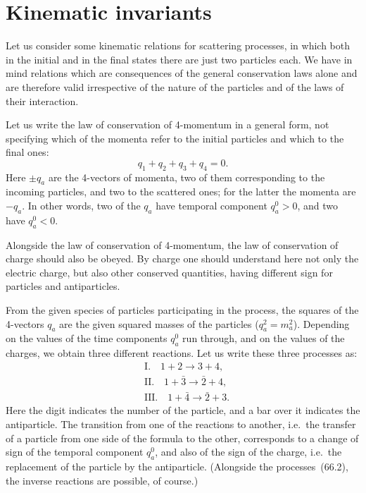 \section{Kinematic invariants}

Let us consider some kinematic relations for scattering processes, in which both in the initial and in the final states there are just two particles each. We have in mind relations which are consequences of the general conservation laws alone and are therefore valid irrespective of the nature of the particles and of the laws of their interaction.

Let us write the law of conservation of 4-momentum in a general form, not specifying which of the momenta refer to the initial particles and which to the final ones:
\begin{equation}
q_1 + q_2 + q_3 + q_4 = 0.
\tag{66.1}
\end{equation}
Here $\pm q_a$ are the 4-vectors of momenta, two of them corresponding to the incoming particles, and two to the scattered ones; for the latter the momenta are $-q_a$.  In other words, two of the $q_a$ have temporal component $q^0_a > 0$, and two have $q^0_a < 0$.

Alongside the law of conservation of 4-momentum, the law of conservation of charge should also be obeyed. By charge one should understand here not only the electric charge, but also other conserved quantities, having different sign for particles and antiparticles.

From the given species of particles participating in the process, the squares of the 4-vectors $q_a$ are the given squared masses of the particles ($q^2_a = m^2_a$). Depending on the values of the time components $q^0_a$ run through, and on the values of the charges, we obtain three different reactions. Let us write these three processes as:
\begin{equation}
\begin{aligned}
&\text{I.}\quad 1 + 2 \to 3 + 4,\\[3pt]
&\text{II.}\quad 1 + \bar{3} \to \bar{2} + 4,\\[3pt]
&\text{III.}\quad 1 + \bar{4} \to \bar{2} + 3.
\end{aligned}
\tag{66.2}
\end{equation}
Here the digit indicates the number of the particle, and a bar over it indicates the antiparticle. The transition from one of the reactions to another, i.e.\ the transfer of a particle from one side of the formula to the other, corresponds to a change of sign of the temporal component $q^0_a$, and also of the sign of the charge, i.e.\ the replacement of the particle by the antiparticle. (Alongside the processes~(66.2), the inverse reactions are possible, of course.)

